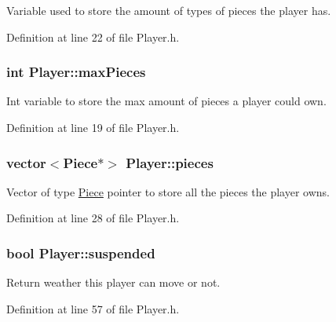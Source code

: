 Variable used to store the amount of types of pieces the player has. 



Definition at line 22 of file Player.\-h.

\hypertarget{classPlayer_a69e6c3b3ae77235f6f47c49b09e67331}{
\subsubsection[{max\-Pieces}]{\setlength{\rightskip}{0pt plus 5cm}int Player\-::max\-Pieces\hspace{0.3cm}{\ttfamily [protected]}}}\label{classPlayer_a69e6c3b3ae77235f6f47c49b09e67331}


Int variable to store the max amount of pieces a player could own. 



Definition at line 19 of file Player.\-h.

\hypertarget{classPlayer_a4e28d717089267557d014e440e910a3b}{
\subsubsection[{pieces}]{\setlength{\rightskip}{0pt plus 5cm}vector$<${\bf Piece}$\ast$$>$ Player\-::pieces\hspace{0.3cm}{\ttfamily [protected]}}}\label{classPlayer_a4e28d717089267557d014e440e910a3b}


Vector of type \hyperlink{classPiece}{Piece} pointer to store all the pieces the player owns. 



Definition at line 28 of file Player.\-h.

\hypertarget{classPlayer_a915c6031e68208b409ce8550419f6247}{
\subsubsection[{suspended}]{\setlength{\rightskip}{0pt plus 5cm}bool Player\-::suspended}}\label{classPlayer_a915c6031e68208b409ce8550419f6247}


Return weather this player can move or not. 



Definition at line 57 of file Player.\-h.

